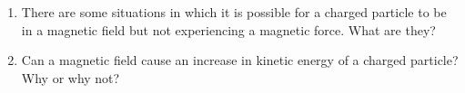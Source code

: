 \begin{enumerate}[itemsep=6pt]
\item There are some situations in which it is possible for a charged particle
  to be in a magnetic field but not experiencing a magnetic force. What are
  they?

\item Can a magnetic field cause an increase in kinetic energy of a charged
  particle? Why or why not?
  
%  
%
%

\end{enumerate}
